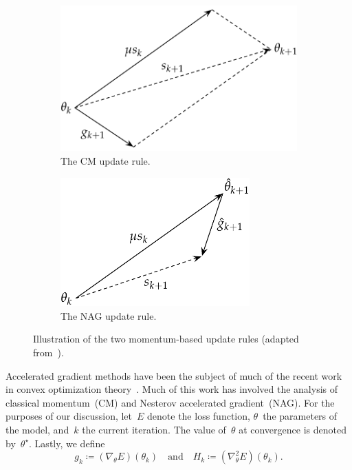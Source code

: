 \documentclass[11pt,a4paper]{article}
\numberwithin{equation}{section}
\begin{document}
\begin{figure}[t]
\centering
\begin{subfigure}[t]{0.4\textwidth}
	\centering
	\includegraphics[width=\textwidth]{graphics/cm_diagram.pdf}
	\caption{The CM update rule.\label{fig:cm_update}}
\end{subfigure}
\begin{subfigure}[t]{0.4\textwidth}
	\centering
	\includegraphics[width=0.8\textwidth]{graphics/nag_diagram.pdf}
	\caption{The NAG update rule.\label{fig:nag_update}}
\end{subfigure}
\caption{Illustration of the two momentum-based update rules (adapted
from~\citet{sutskever2013importance}).\label{fig:momentum_updates}}
\end{figure}

Accelerated gradient methods have been the subject of much of the recent work in
convex optimization theory~\citep{sutskever2013importance}. Much of this work
has involved the analysis of classical momentum~(CM) and Nesterov accelerated
gradient~(NAG). For the purposes of our discussion, let~$E$ denote the loss
function, $\theta$~the parameters of the model, and~$k$ the current iteration.
The value of~$\theta$ at convergence is denoted by~$\theta^\star$. Lastly, we
define
\[
	g_k \coloneqq (\nabla_\theta E)(\theta_k)
	\quad\text{and}\quad
	H_k \coloneqq (\nabla^2_\theta E)(\theta_k).
\]
\end{document}
